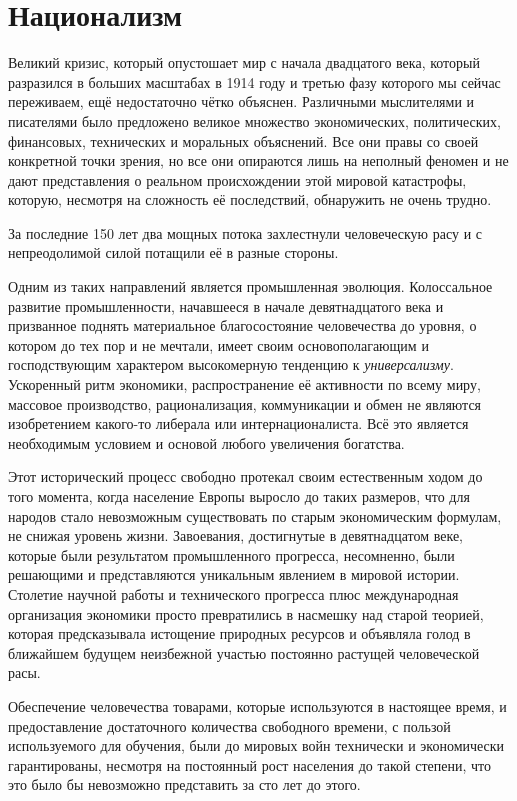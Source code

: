 \chapter{Национализм}

Великий кризис, который опустошает мир с начала двадцатого века, который разразился в больших масштабах в 1914 году и третью фазу которого мы сейчас переживаем, ещё недостаточно чётко объяснен. Различными мыслителями и писателями было предложено великое множество экономических, политических, финансовых, технических и моральных объяснений. Все они правы со своей конкретной точки зрения, но все они опираются лишь на неполный феномен и не дают представления о реальном происхождении этой мировой катастрофы, которую, несмотря на сложность её последствий, обнаружить не очень трудно.
 
За последние 150 лет два мощных потока захлестнули человеческую расу и с непреодолимой силой потащили её в разные стороны.

Одним из таких направлений является промышленная эволюция. Колоссальное развитие промышленности, начавшееся в начале девятнадцатого века и призванное поднять материальное благосостояние человечества до уровня, о котором до тех пор и не мечтали, имеет своим основополагающим и господствующим характером высокомерную тенденцию к \textit{универсализму}. Ускоренный ритм экономики, распространение её активности по всему миру, массовое производство, рационализация, коммуникации и обмен не являются изобретением какого-то либерала или интернационалиста. Всё это является необходимым условием и основой любого увеличения богатства.

Этот исторический процесс свободно протекал своим естественным ходом до того момента, когда население Европы выросло до таких размеров, что для народов стало невозможным существовать по старым экономическим формулам, не снижая уровень жизни. Завоевания, достигнутые в девятнадцатом веке, которые были результатом промышленного прогресса, несомненно, были решающими и представляются уникальным явлением в мировой истории. Столетие научной работы и технического прогресса плюс международная организация экономики просто превратились в насмешку над старой теорией, которая предсказывала истощение природных ресурсов и объявляла голод в ближайшем будущем неизбежной участью постоянно растущей человеческой расы.

Обеспечение человечества товарами, которые используются в настоящее время, и предоставление достаточного количества свободного времени, с пользой используемого для обучения, были до мировых войн технически и экономически гарантированы, несмотря на постоянный рост населения до такой степени, что это было бы невозможно представить за сто лет до этого.

